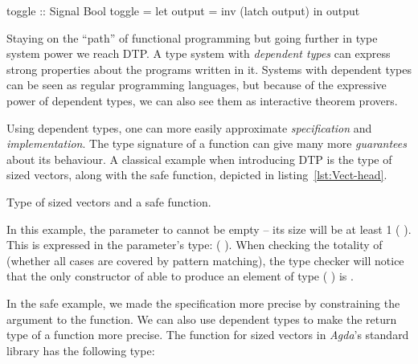     \begin{haskellcode}
        toggle :: Signal Bool
        toggle = let output = inv (latch output) in output
    \end{haskellcode}

    Staying on the ``path'' of functional programming but going further in type system power we reach \ac{DTP}.
    A type system with \emph{dependent types} can express strong properties about the programs written in it.
    Systems with dependent types can be seen as regular programming languages,
    but because of the expressive power of dependent types, we can also see them as interactive theorem provers.

    Using dependent types, one can more easily approximate \emph{specification} and \emph{implementation}.
    The type signature of a function can give many more \emph{guarantees} about its behaviour.
    A classical example when introducing \ac{DTP} is the type of sized vectors,
    along with the safe  function, depicted in listing~\ref{lst:Vect-head}.

    \begin{listing}[h]
        \caption{Type of sized vectors and a safe  function. \label{lst:Vect-head}}
    \end{listing}

    In this example, the parameter to  cannot be empty -- its size will be at least 1 ( ).
    This is expressed in the parameter's type:   ( ).
    When checking the totality of  (whether all cases are covered by pattern matching),
    the type checker will notice that the only constructor of 
    able to produce an element of type   ( ) is .

    In the safe  example, we made the specification more precise by constraining the argument to the function.
    We can also use dependent types to make the return type of a function more precise.
    The  function for sized vectors in \emph{Agda}'s standard library has the following type:

    \begin{listing}[h]
    \end{listing}

